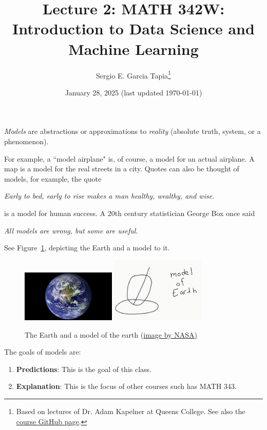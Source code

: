 \documentclass[12pt, a4paper]{article}
\title{Lecture 2: MATH 342W: Introduction to Data Science and Machine Learning}
\author{Sergio E. Garcia Tapia\thanks{Based on lectures of Dr. Adam Kapelner at Queens College.
		See also the \href{https://github.com/kapelner/QC_MATH_342W_Spring_2025}{course GitHub page}.}}
\date{January 28, 2025 (last updated \today)}
\theoremstyle{definition}
\begin{document}
	\maketitle
	\textit{Models} are abstractions or approximations to \textit{reality} (absolute truth,
	system, or a phenomenon).
	
	For example, a ``model airplane" is, of course, a model for an actual airplane.
	A map is a model for the real streets in a city. Quotes can also be thought of models,
	for example, the quote
	\begin{displayquote}
		\textit{Early to bed, early to rise makes a man healthy, wealthy, and wise.}
	\end{displayquote}
	is a model for human success. A 20th century statistician George Box once said
	\begin{displayquote}
		\textit{All models are wrong, but some are useful.}
	\end{displayquote}
	See Figure~\ref{fig:earth-model}, depicting the Earth and a model to it.
	\begin{figure}
		\centering
		\includegraphics[width=0.4\textwidth]{earth}
		\hspace{2cm}
		\includegraphics[width=0.4\textwidth]{model-of-earth}
		\caption{The Earth and a model of the earth (\href{https://www.space.com/54-earth-history-composition-and-atmosphere.html}{image by NASA)}}
		\label{fig:earth-model}
	\end{figure}
	The goals of models are:
	\begin{enumerate}[label=(\arabic*)]
		\item \textbf{Predictions}: This is the goal of this class.
		\item \textbf{Explanation}: This is the focus of other courses such has MATH 343.
	\end{enumerate}
\end{document}
